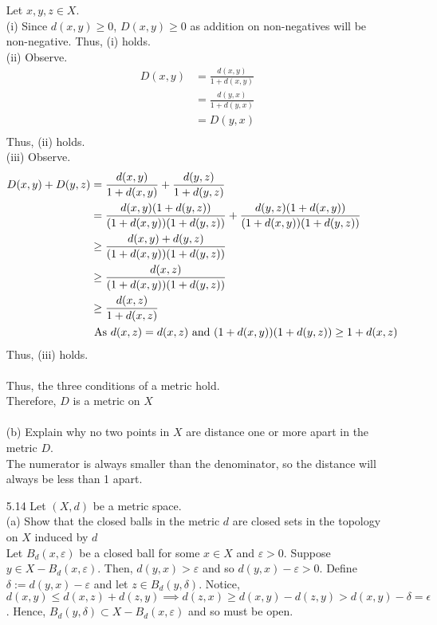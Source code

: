 \documentclass[12pt]{article}
\newcommand{\1}{^{-1}}
\begin{document}
\begin{enumerate}
		Let $ x,y,z\in X $.
		\\
		(i) Since $ d(x,y)\geq 0 $,  $ D(x,y) \geq 0 $ as addition on non-negatives will be non-negative. 
		Thus, (i) holds.\\
		
		(ii) Observe. 
		\begin{align*}
		D(x,y) &= \frac{d(x,y)}{1+d(x,y)}\\
		&= \frac{d(y,x)}{1+d(y,x)}\\
		&= D(y,x)\\
		\end{align*}
		Thus, (ii) holds.\\
		(iii)
		Observe.
		\begin{align*}
		D(x,y)+D(y,z)&= \frac{d(x,y)}{1+d(x,y)} + \frac{d(y,z)}{1+d(y,z)} \\
		&= \frac{d(x,y)(1+d(y,z))}{(1+d(x,y))(1+d(y,z))} + \frac{d(y,z)(1+d(x,y))}{(1+d(x,y))(1+d(y,z))}\\
		&\geq \frac{d(x,y)+d(y,z)}{(1+d(x,y))(1+d(y,z))}\\
		&\geq \frac{d(x,z)}{(1+d(x,y))(1+d(y,z))}\\
		&\geq \frac{d(x,z)}{1+d(x,z)} \\
		&\text{ As $ d(x,z)=d(x,z)  $ and $ (1+d(x,y))(1+d(y,z)) \geq 1+d(x,z)$ }
		\end{align*}
		Thus, (iii) holds.\\
		\\
		Thus, the three conditions of a metric hold.\\
		Therefore, $ D $ is a metric on $ X $\\
		\\
		(b) Explain why no two points in $X$ are distance one or more apart in the metric $D$.\\
		The numerator is always smaller than the denominator, so the distance will always be less than 1 apart.
		\item[5.14] Let $(X, d)$ be a metric space.\\
		(a) Show that the closed balls in the metric $d$ are closed sets in the topology on $X$ induced by $d$\\
		Let $ B_d(x, \varepsilon) $ be a closed ball for some $ x\in X $ and $ \varepsilon > 0 $. Suppose $ y\in X-B_d(x,\varepsilon) $. Then,  $ d(y,x) > \varepsilon $ and so $ d(y,x)-\varepsilon > 0 $. Define $ \delta := d(y,x)-\varepsilon $ and let $ z\in B_d(y,\delta) $. Notice, $ d(x,y)\leq d(x,z)+d(z,y) \implies d(z,x) \geq d(x,y)-d(z,y)>d(x,y)-\delta = \epsilon $. Hence, $ B_d(y,\delta) \subset X-B_d(x,\varepsilon) $ and so must be open. \\

\end{enumerate}
\end{document}

